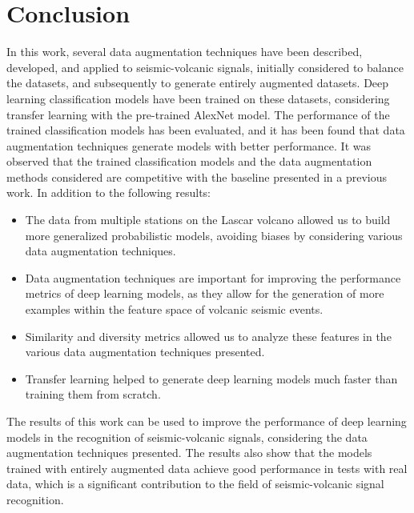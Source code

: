 \documentclass[journal]{IEEEtran}
\begin{document}


\section{Conclusion}
In this work, several data augmentation techniques have been described, developed, and applied to seismic-volcanic signals, initially considered to balance the datasets, and subsequently to generate entirely augmented datasets. Deep learning classification models have been trained on these datasets, considering transfer learning with the pre-trained AlexNet model.
The performance of the trained classification models has been evaluated, and it has been found that data augmentation techniques generate models with better performance.
It was observed that the trained classification models and the data augmentation methods considered are competitive with the baseline presented in a previous work. In addition to the following results:
\begin{itemize}
 \item The data from multiple stations on the Lascar volcano allowed us to build more generalized probabilistic models, avoiding biases by considering various data augmentation techniques.
 \item Data augmentation techniques are important for improving the performance metrics of deep learning models, as they allow for the generation of more examples within the feature space of volcanic seismic events.
 \item Similarity and diversity metrics allowed us to analyze these features in the various data augmentation techniques presented.
 \item Transfer learning helped to generate deep learning models much faster than training them from scratch.
\end{itemize}
The results of this work can be used to improve the performance of deep learning models in the recognition of seismic-volcanic signals, considering the data augmentation techniques presented. The results also show that the models trained with entirely augmented data achieve good performance in tests with real data, which is a significant contribution to the field of seismic-volcanic signal recognition.
\end{document}
